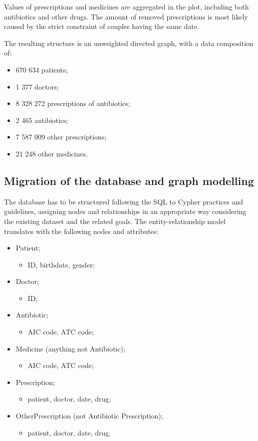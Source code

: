 Values of prescriptions and medicines are aggregated in the plot, including both antibiotics and other drugs. The amount of removed prescriptions is most likely caused by the strict constraint of couples having the same date.

The resulting structure is an unweighted directed graph, with a data composition of:
\begin{itemize}
	\item 670 634 patients;
	\item 1 377 doctors;
	\item 8 328 272 prescriptions of antibiotics;
	\item 2 465 antibiotics;
	\item 7 587 009 other prescriptions;
	\item 21 248 other medicines.
\end{itemize}

\subsection{Migration of the database and graph modelling}
The database has to be structured following the SQL to Cypher practices and guidelines, assigning nodes and relationships in an appropriate way considering the existing dataset and the related goals. The entity-relationship model translates with the following nodes and attributes:
\begin{itemize}
	\item Patient;
	\begin{itemize}
		\item ID, birthdate, gender;
	\end{itemize}
	\item Doctor;
	\begin{itemize}
		\item ID; 
	\end{itemize}
	\item Antibiotic;
	\begin{itemize}
		\item AIC code, ATC code;
	\end{itemize}
	\item Medicine (anything not Antibiotic);
	\begin{itemize}
		\item AIC code, ATC code;
	\end{itemize}
	\item Prescription;
	\begin{itemize}
		\item patient, doctor, date, drug;
	\end{itemize}
	\item OtherPrescription (not Antibiotic Prescription);
	\begin{itemize}
		\item patient, doctor, date, drug.
	\end{itemize}
\end{itemize}

